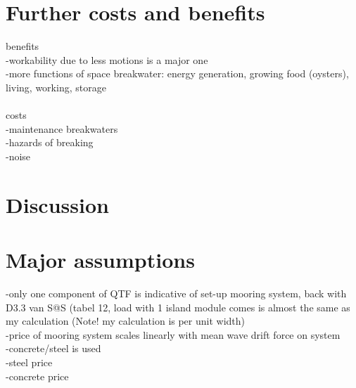 






\section{Further costs and benefits}

benefits\\
-workability due to less motions is a major one\\
-more functions of space breakwater: energy generation, growing food (oysters), living, working, storage\\
\\


costs\\
-maintenance breakwaters\\
-hazards of breaking\\
-noise\\




\section{Discussion}

\section{Major assumptions}
-only one component of QTF is indicative of set-up mooring system, back with D3.3 van S@S (tabel 12, load with 1 island module comes is almost the same as my calculation (Note! my calculation is per unit width)\\
-price of mooring system scales linearly with mean wave drift force on system\\
-concrete/steel is used\\
-steel price\\
-concrete price\\
